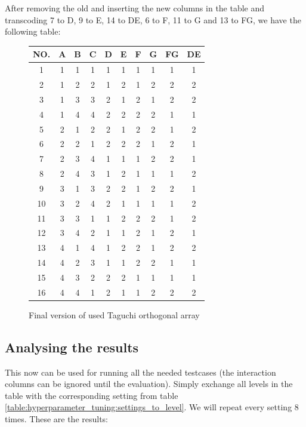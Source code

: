 After removing the old and inserting the new columns in the table and transcoding 7 to D, 9 to E, 14 to DE, 6 to F, 11 to G and 13 to FG, we have the following table:

\begin{figure}[H]
	\centering
	\begin{tabular}{ |c||c|c|c|c|c|c|c|c|c|  }
		\hline
		NO.& A & B & C & D & E & F & G & FG& DE\\
		\hline
		1  & 1 & 1 & 1 & 1 & 1 & 1 & 1 & 1 & 1\\
		2  & 1 & 2 & 2 & 1 & 2 & 1 & 2 & 2 & 2\\
		3  & 1 & 3 & 3 & 2 & 1 & 2 & 1 & 2 & 2\\
		4  & 1 & 4 & 4 & 2 & 2 & 2 & 2 & 1 & 1\\
		5  & 2 & 1 & 2 & 2 & 1 & 2 & 2 & 1 & 2\\
		6  & 2 & 2 & 1 & 2 & 2 & 2 & 1 & 2 & 1\\
		7  & 2 & 3 & 4 & 1 & 1 & 1 & 2 & 2 & 1\\
		8  & 2 & 4 & 3 & 1 & 2 & 1 & 1 & 1 & 2\\
		9  & 3 & 1 & 3 & 2 & 2 & 1 & 2 & 2 & 1\\
		10 & 3 & 2 & 4 & 2 & 1 & 1 & 1 & 1 & 2\\
		11 & 3 & 3 & 1 & 1 & 2 & 2 & 2 & 1 & 2\\
		12 & 3 & 4 & 2 & 1 & 1 & 2 & 1 & 2 & 1\\
		13 & 4 & 1 & 4 & 1 & 2 & 2 & 1 & 2 & 2\\
		14 & 4 & 2 & 3 & 1 & 1 & 2 & 2 & 1 & 1\\
		15 & 4 & 3 & 2 & 2 & 2 & 1 & 1 & 1 & 1\\
		16 & 4 & 4 & 1 & 2 & 1 & 1 & 2 & 2 & 2\\
		\hline
	\end{tabular}
	\caption{Final version of used Taguchi orthogonal array}
\end{figure}


\subsection{Analysing the results}

This now can be used for running all the needed testcases (the interaction columns can be ignored until the evaluation). Simply exchange all levels in the table with the corresponding setting from table \ref{table:hyperparameter_tuning:settings_to_level}. We will repeat every setting 8 times. These are the results:


